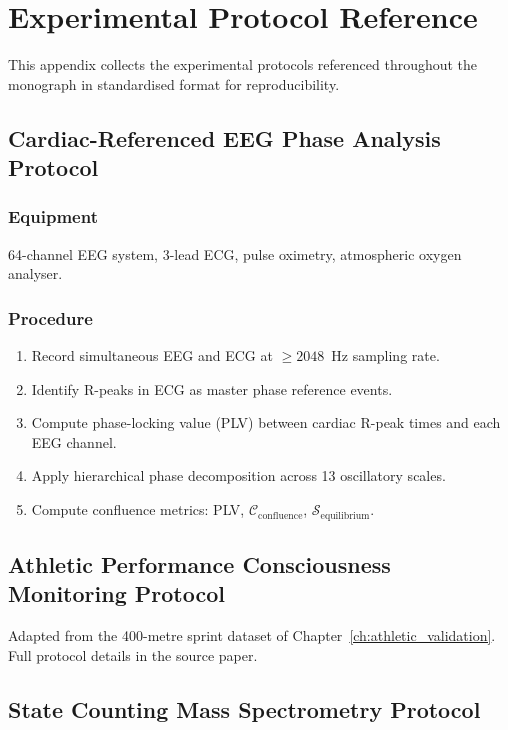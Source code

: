 \chapter{Experimental Protocol Reference}
\label{app:protocols}

This appendix collects the experimental protocols referenced throughout the monograph in standardised format for reproducibility.

\section{Cardiac-Referenced EEG Phase Analysis Protocol}

\subsection{Equipment}
64-channel EEG system, 3-lead ECG, pulse oximetry, atmospheric oxygen analyser.

\subsection{Procedure}
\begin{enumerate}
  \item Record simultaneous EEG and ECG at $\geq 2048$~Hz sampling rate.
  \item Identify R-peaks in ECG as master phase reference events.
  \item Compute phase-locking value (PLV) between cardiac R-peak times and each EEG channel.
  \item Apply hierarchical phase decomposition across 13 oscillatory scales.
  \item Compute confluence metrics: PLV, $\mathcal{C}_{\mathrm{confluence}}$, $\mathcal{S}_{\mathrm{equilibrium}}$.
\end{enumerate}

\section{Athletic Performance Consciousness Monitoring Protocol}

Adapted from the 400-metre sprint dataset of Chapter~\ref{ch:athletic_validation}. Full protocol details in the source paper.

\section{State Counting Mass Spectrometry Protocol}

